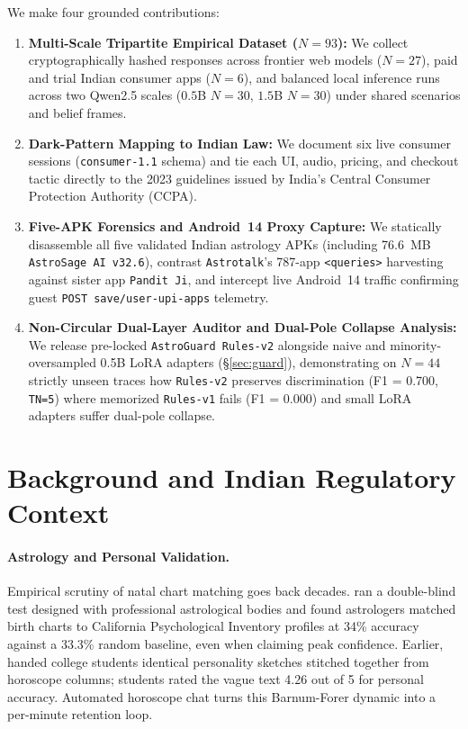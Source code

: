 We make four grounded contributions:
\begin{enumerate}[leftmargin=*,itemsep=2pt,topsep=3pt]
\item \textbf{Multi-Scale Tripartite Empirical Dataset ($N=93$):} We collect cryptographically hashed responses across frontier web models ($N=27$), paid and trial Indian consumer apps ($N=6$), and balanced local inference runs across two Qwen2.5 scales ($0.5$B $N=30$, $1.5$B $N=30$) under shared scenarios and belief frames.
\item \textbf{Dark-Pattern Mapping to Indian Law:} We document six live consumer sessions (\texttt{consumer-1.1} schema) and tie each UI, audio, pricing, and checkout tactic directly to the 2023 guidelines issued by India's Central Consumer Protection Authority (CCPA).
\item \textbf{Five-APK Forensics and Android~14 Proxy Capture:} We statically disassemble all five validated Indian astrology APKs (including 76.6~MB \texttt{AstroSage AI v32.6}), contrast \texttt{Astrotalk}'s 787-app \texttt{<queries>} harvesting against sister app \texttt{Pandit Ji}, and intercept live Android~14 traffic confirming guest \texttt{POST save/user-upi-apps} telemetry.
\item \textbf{Non-Circular Dual-Layer Auditor and Dual-Pole Collapse Analysis:} We release pre-locked \texttt{AstroGuard Rules-v2} alongside naive and minority-oversampled 0.5B LoRA adapters (\S\ref{sec:guard}), demonstrating on $N=44$ strictly unseen traces how \texttt{Rules-v2} preserves discrimination (F1 = 0.700, \texttt{TN=5}) where memorized \texttt{Rules-v1} fails (F1 = 0.000) and small LoRA adapters suffer dual-pole collapse.
\end{enumerate}

\section{Background and Indian Regulatory Context}
\label{sec:related}

\paragraph{Astrology and Personal Validation.}
Empirical scrutiny of natal chart matching goes back decades. \citet{carlson1985} ran a double-blind test designed with professional astrological bodies and found astrologers matched birth charts to California Psychological Inventory profiles at 34\% accuracy against a 33.3\% random baseline, even when claiming peak confidence. Earlier, \citet{forer1949} handed college students identical personality sketches stitched together from horoscope columns; students rated the vague text 4.26 out of 5 for personal accuracy. Automated horoscope chat turns this Barnum-Forer dynamic into a per-minute retention loop.

